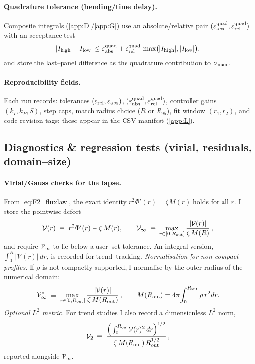 \documentclass{iopjournal}
\begin{document}
\paragraph{Quadrature tolerance (bending/time delay).}
Composite integrals (\cref{app:D}/\cref{app:G}) use an absolute/relative pair $(\varepsilon_{\rm abs}^{\rm quad},\varepsilon_{\rm rel}^{\rm quad})$ with an acceptance test
\begin{equation}
|I_{\rm high}-I_{\rm low}|\le \varepsilon_{\rm abs}^{\rm quad}
+\varepsilon_{\rm rel}^{\rm quad}\,\max\!\big(|I_{\rm high}|,|I_{\rm low}|\big),
\label{eq:K4_quad_tol}
\end{equation}
and store the last–panel difference as the quadrature contribution to $\sigma_{\rm num}$.

\paragraph{Reproducibility fields.}
Each run records: tolerances $(\varepsilon_{\rm rel},\varepsilon_{\rm abs})$, $(\varepsilon_{\rm abs}^{\rm quad},\varepsilon_{\rm rel}^{\rm quad})$, controller gains $(k_I,k_P,S)$, step caps, match radius choice ($R$ or $R_{95}$), fit window $(r_1,r_2)$, and code revision tags; these appear in the CSV manifest (\cref{app:L}).

\subsection{Diagnostics \& regression tests (virial, residuals, domain–size)}\label{app:K5}
\paragraph{Virial/Gauss checks for the lapse.}
From \eqref{eq:F2_fluxlaw}, the exact identity $r^{2}\Phi'(r)=\zeta M(r)$ holds for all $r$. I store the pointwise defect
\begin{equation}
\mathcal V(r)\;\equiv\;r^{2}\Phi'(r)-\zeta\,M(r),
\qquad
\mathcal V_{\infty}\;\equiv\;\max_{r\in[0,R_{\rm out}]}\frac{|\mathcal V(r)|}{\zeta\,M(R)}\,,
\label{eq:K5_virial}
\end{equation}
and require $\mathcal V_{\infty}$ to lie below a user–set tolerance. An integral version,
$\int_{0}^{R} |\mathcal V(r)|\,dr$, is recorded for trend–tracking.
\noindent\textit{Normalisation for non-compact profiles.}
If $\rho$ is not compactly supported, I normalise by the outer radius of the numerical domain:
\begin{equation}
\mathcal V_{\infty}^{\ast}\;\equiv\;\max_{r\in[0,R_{\rm out}]}\frac{|\mathcal V(r)|}{\zeta\,M(R_{\rm out})}\,,
\qquad M(R_{\rm out})=4\pi\!\int_{0}^{R_{\rm out}}\rho\,r^{2}dr.
\label{eq:K5_virial_noncompact}
\end{equation}
\textit{Optional $L^{2}$ metric.}
For trend studies I also record a dimensionless $L^{2}$ norm,
\begin{equation}
\mathcal V_{2}\;\equiv\;\frac{\Big(\int_{0}^{R_{\rm out}}\!\mathcal V(r)^{2}\,dr\Big)^{1/2}}{\zeta\,M(R_{\rm out})\,R_{\rm out}^{1/2}}\,,
\label{eq:K5_virial_L2}
\end{equation}
reported alongside $\mathcal V_{\infty}$.
\end{document}
